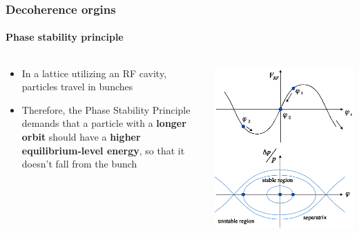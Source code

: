 \documentclass{beamer}
\begin{document}
\begin{frame}\frametitle{Decoherence orgins} \framesubtitle{Phase stability principle}
  \begin{columns}
    \begin{column}{.5\textwidth}
      \begin{itemize}
      \item In a lattice utilizing an RF cavity, particles travel in bunches
      \item Therefore, the Phase Stability Principle demands that a particle with a \textbf{longer orbit} should have a \textbf{higher equilibrium-level energy}, so that it doesn't fall from the bunch
      \end{itemize}
    \end{column}
    \begin{column}{.5\textwidth}
      \centering
      \includegraphics[width=\linewidth]{psp_diagram}
    \end{column}
  \end{columns}
\end{frame}
\end{document}
